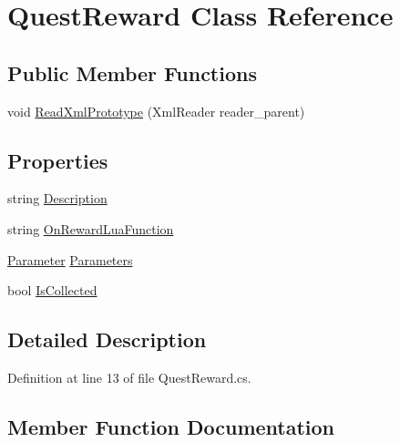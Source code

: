 \hypertarget{class_quest_reward}{}\section{Quest\+Reward Class Reference}
\label{class_quest_reward}
\subsection*{Public Member Functions}
\begin{DoxyCompactItemize}
\item 
void \hyperlink{class_quest_reward_a0189966bf985f27b2892f85dbcc3615c}{Read\+Xml\+Prototype} (Xml\+Reader reader\+\_\+parent)
\end{DoxyCompactItemize}
\subsection*{Properties}
\begin{DoxyCompactItemize}
\item 
string \hyperlink{class_quest_reward_a00f408d73c807e29e4bb68e3c8ba3319}{Description}
\item 
string \hyperlink{class_quest_reward_aaee12a40fcaaaa0de6f23b9b76e4661a}{On\+Reward\+Lua\+Function}
\item 
\hyperlink{class_parameter}{Parameter} \hyperlink{class_quest_reward_ae4f3170c2c953a87d82f8d44f15de75c}{Parameters}
\item 
bool \hyperlink{class_quest_reward_ae3b7842d8d4d142a91e990c3351496b1}{Is\+Collected}
\end{DoxyCompactItemize}


\subsection{Detailed Description}


Definition at line 13 of file Quest\+Reward.\+cs.



\subsection{Member Function Documentation}
\mbox{\label{class_quest_reward_a0189966bf985f27b2892f85dbcc3615c}} 
